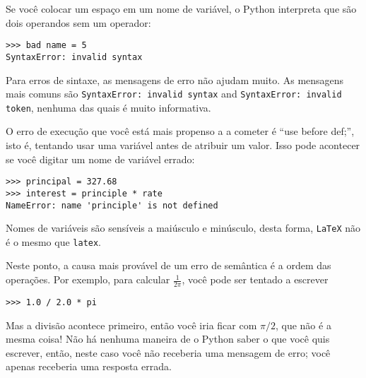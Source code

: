 {{{{{{{{{{{{{{{{{

Se você colocar um espaço em um nome de variável, o Python interpreta que são dois 
operandos sem um operador: 

\beforeverb
\begin{verbatim}
>>> bad name = 5
SyntaxError: invalid syntax
\end{verbatim}
\afterverb
%

Para erros de sintaxe, as mensagens de erro não ajudam muito. 
As mensagens mais comuns são {\tt SyntaxError: invalid syntax} and
{\tt SyntaxError: invalid token}, nenhuma das quais é muito informativa.


O erro de execução que você está mais propenso a a cometer é ``use 
before def;'', isto é, tentando usar uma variável antes de atribuir 
um valor. Isso pode acontecer se você digitar um nome de variável errado:

\beforeverb
\begin{verbatim}
>>> principal = 327.68
>>> interest = principle * rate
NameError: name 'principle' is not defined
\end{verbatim}
\afterverb
%
Nomes de variáveis são sensíveis a maiúsculo e minúsculo, desta forma, {\tt LaTeX} 
não é o mesmo que {\tt latex}.


Neste ponto, a causa mais provável de um erro de semântica é 
a ordem das operações. Por exemplo, para calcular $\frac{1}{2 \pi}$,
você pode ser tentado a escrever

\beforeverb
\begin{verbatim}
>>> 1.0 / 2.0 * pi
\end{verbatim}
\afterverb
%
Mas a divisão acontece primeiro, então você iria ficar com $\pi / 2$, que 
não é a mesma coisa! Não há nenhuma maneira de o Python 
saber o que você quis escrever, então, neste caso você não 
receberia uma mensagem de erro; você apenas receberia uma resposta errada.

}}}}}}}}}}}}}}}}}
